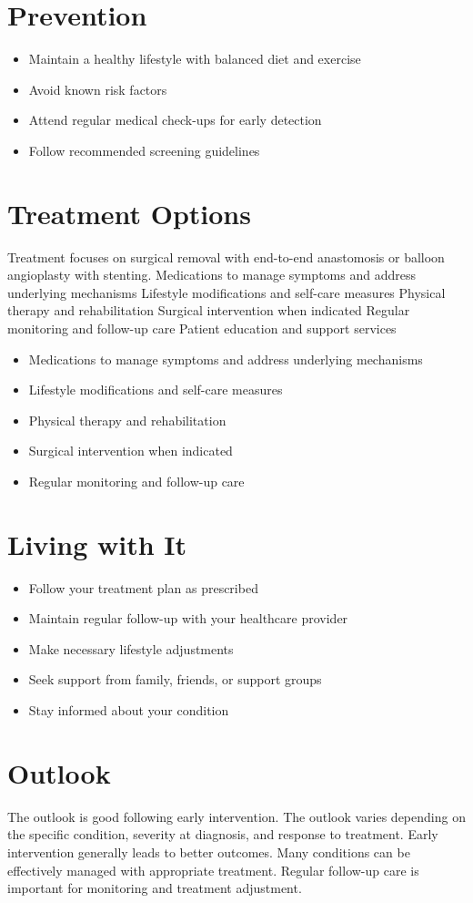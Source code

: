 \section{Prevention}
\begin{itemize}[noitemsep]
  \item Maintain a healthy lifestyle with balanced diet and exercise
  \item Avoid known risk factors
  \item Attend regular medical check-ups for early detection
  \item Follow recommended screening guidelines
\end{itemize}
\section{Treatment Options}
Treatment focuses on surgical removal with end-to-end anastomosis or balloon angioplasty with stenting. Medications to manage symptoms and address underlying mechanisms Lifestyle modifications and self-care measures Physical therapy and rehabilitation Surgical intervention when indicated Regular monitoring and follow-up care Patient education and support services

\begin{itemize}[noitemsep]
  \item Medications to manage symptoms and address underlying mechanisms
  \item Lifestyle modifications and self-care measures
  \item Physical therapy and rehabilitation
  \item Surgical intervention when indicated
  \item Regular monitoring and follow-up care
\end{itemize}
\section{Living with It}
\begin{itemize}[noitemsep]
  \item Follow your treatment plan as prescribed
  \item Maintain regular follow-up with your healthcare provider
  \item Make necessary lifestyle adjustments
  \item Seek support from family, friends, or support groups
  \item Stay informed about your condition
\end{itemize}
\section{Outlook}
The outlook is good following early intervention. The outlook varies depending on the specific condition, severity at diagnosis, and response to treatment. Early intervention generally leads to better outcomes. Many conditions can be effectively managed with appropriate treatment. Regular follow-up care is important for monitoring and treatment adjustment.

